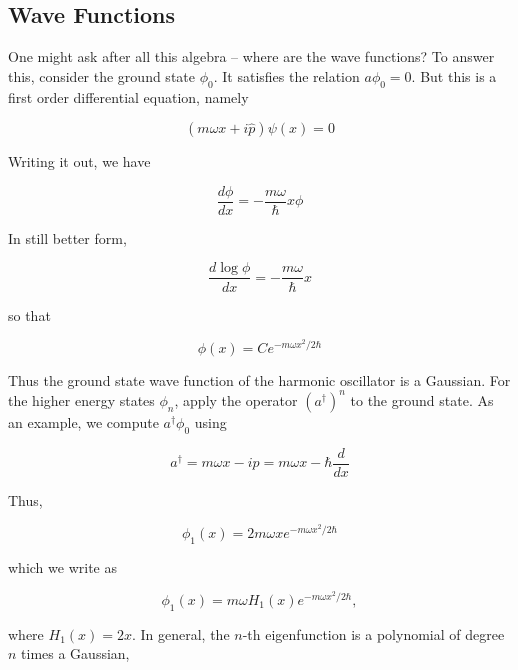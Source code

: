\subsection{Wave Functions}

One might ask after all this algebra -- where are the wave functions?  To answer this, consider the ground state $\phi_0$.  It satisfies the relation $a\phi_0 = 0$.  But this is a first order differential equation, namely

\begin{equation}
(m\omega x + i\hat p)\psi(x) = 0
\end{equation}

Writing it out, we have

\begin{equation}
  \frac{d\phi}{dx} = -\frac{m\omega}{\hbar} x \phi
\end{equation}

In still better form,

\begin{equation}
  \frac{d\log\phi}{dx} = -\frac{m\omega}{\hbar} x 
\end{equation}

so that

\begin{equation}
  \phi(x) = Ce^{ -m\omega  x^2/2  \hbar}
\end{equation}

Thus the ground state wave function of the harmonic oscillator is a Gaussian.  For the higher energy states $\phi_n$, apply the operator $(a^\dagger)^n$ to the ground state.  As an example, we compute $a^\dagger \phi_0$ using

\begin{equation}
a^\dagger = m\omega x - i\hat p = m\omega x - \hbar\frac{d}{dx}
\end{equation}

Thus,

\begin{equation}
\phi_1(x) = 2m\omega x e^{-m\omega x^2/2\hbar} 
\end{equation}

which we write as

\begin{equation}
\phi_1(x) = m\omega H_1(x)  e^{-m\omega x^2/2\hbar},
\end{equation}

where $H_1(x) = 2x$. In general, the $n$-th eigenfunction is a polynomial of degree $n$ times a Gaussian,

